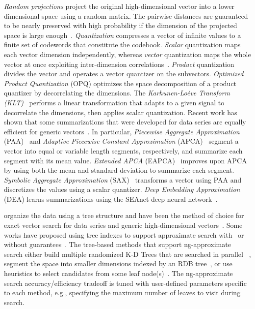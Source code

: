  \textit{Random projections} 
project the original high-dimensional vector into a lower dimensional space using a random matrix. The pairwise distances are guaranteed to be nearly preserved with high probability if the dimension of the projected space is large enough~\cite{conf/map/johnson84}. \textit{Quantization} compresses a vector of infinite values to a finite set of codewords that constitute the codebook. \emph{Scalar} quantization maps each vector dimension independently, whereas \emph{vector} quantization maps the whole vector at once exploiting inter-dimension correlations~\cite{journal/tit/gray1998}.  \emph{Product} quantization~\cite{gist} divides the vector and operates a vector quantizer on the subvectors. {\it Optimized Product Quantization} (OPQ) optimizes the space decomposition of a product quantizer by decorrelating the dimensions. 
The \textit{Karhunen-Lo\`{e}ve Transform (KLT)}~\cite{karhunen1947ueber,loeve1948functions} performs a linear transformation that adapts to a given signal to decorrelate the dimensions, then applies scalar quantization. Recent work has shown that some summarizations that were developed for data series are equally efficient for generic vectors~\cite{lernaeanhydra2,hercules}. 
In particular, 
\textit{Piecewise Aggregate Approximation} (PAA)~\cite{journal/kais/Keogh2001} and {\it Adaptive Piecewise Constant Approximation} (APCA)~\cite{journal/acds/Chakrabarti2002} segment a vector into equal or variable length segments, respectively, and summarize each segment with its mean value. 
{\it Extended APCA} (EAPCA)~\cite{conf/vldb/Wang2013} improves upon APCA by using both the mean and standard deviation to summarize each segment. {\it Symbolic Aggregate Approximation} (SAX)~\cite{conf/dmkd/LinKLC03} transforms a vector using PAA and discretizes the values using a scalar quantizer. 
{\it Deep Embedding Approximation} (DEA) learns summarizations using the SEAnet deep neural network~\cite{seanetjournal}.


 organize the data using a tree structure and have been the method of choice for exact vector search for data series and generic high-dimensional vectors~\cite{conf/sigmod/Guttman1984,conf/icmd/Beckmann1990,journal/edbt/Schafer2012,conf/vldb/Wang2013,zoumpatianos2016ads,coconutjournal,ulissejournal,twinsubsequences,dpisaxjournal,localgeolocatetedsimilarity,parisplus,messijournal,sing,phd-workshop-karima,seanetjournal,dumpy,oddysey,fresh}. 
Some works have proposed using tree indexes to support approximate search with~\cite{mtree-pac,lernaeanhydra2} or without guarantees~\cite{flann,hdindex,lernaeanhydra2,dumpy}. 
The tree-based methods that support ng-approximate search either build multiple randomized K-D Trees that are searched in parallel 
~\cite{flann}, segment the space into smaller dimensions indexed by an RDB tree~\cite{hdindex}, or use heuristics to select candidates from some leaf node(s)~\cite{lernaeanhydra2,dumpy}. 
The ng-approximate search accuracy/efficiency tradeoff is tuned with user-defined parameters specific to each method, e.g., specifying the maximum number of leaves to visit during search.

